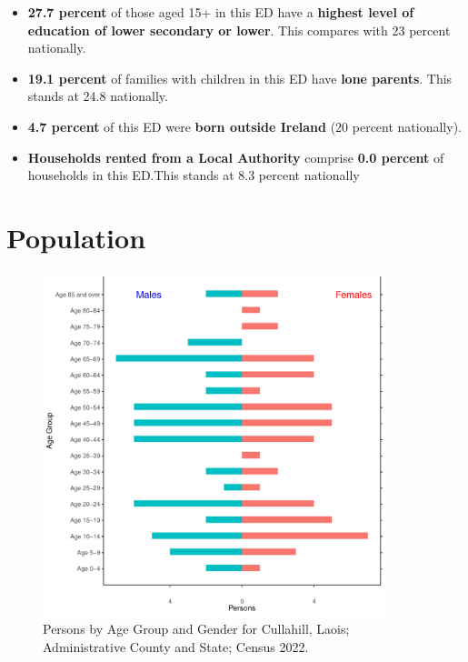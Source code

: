 \documentclass{article}
\begin{document}
\begin{itemize}
\item \textbf{27.7 percent} of those aged 15+ in this ED have a \textbf{highest level of education of lower secondary or lower}. This compares with 23 percent nationally. 

\item \textbf{19.1 percent} of families with children in this ED have \textbf{lone parents}. This stands at 24.8 nationally.

\item \textbf{4.7 percent} of this ED were \textbf{born outside Ireland} (20 percent nationally).

\item \textbf{Households rented from a Local Authority} comprise \textbf{0.0 percent} of households in this ED.This stands at 8.3 percent nationally

\end{itemize}

\pagebreak

\section{Population} 
\label{sect:Pop}

\begin{figure}[h]
	\centering
	\includegraphics[width = 100mm]{../figures/PyramidPlot.pdf}
	\caption{Persons by Age Group and Gender for Cullahill, Laois; Administrative County and State; Census 2022.}
	\label{fig:2ae19629-1a6a-13a3-e055-000000000001}
	\end{figure}
\end{document}

